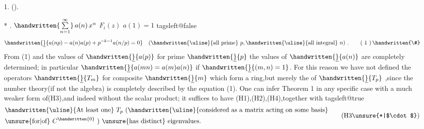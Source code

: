  1. ().

*  .  $\handwritten{\sum\limits_{n=1}^{\infty}}\,a(n)\,x^{n}$  $F_i(z)$  $a(1)=1$ 
\csname tagsleft@false\endcsname
\[
\handwritten{\underline}{a(np)-a(n)a(p)+p^{-k-1}a(n/p)=0}\quad
(\text{\handwritten{\uline}{all prime} }p,\text{\handwritten{\uline}{all integral} }n)\ .
\tag*{( 1 )\,\handwritten{\#}}
\]
From (1) and the values of $\handwritten{\underline}{a(p)}$ for prime $\handwritten{\underline}{p}$ the values of $\handwritten{\underline}{a(n)}$ are completely determined; in particular $\handwritten{\underline}{a(mn)=a(m)a(n)}$ if $\handwritten{\underline}{(m,n)=1}$. For this reason we have not defined the operators $\handwritten{\underline}{T_m}$ for composite $\handwritten{\underline}{m}$ which form a ring,but merely the  of $\handwritten{\underline}{T_p}$ ,since the number theory(if not the algebra) is completely described by the equation (1). One can infer Theorem 1 in any specific case with a much weaker form of(H3),and indeed without the scalar product; it suffices to have (H1),(H2),(H4),together with
\csname tagsleft@true\endcsname
\[
\begin{aligned}
&\text{\handwritten{\uline}{At least one} } T_p\ \text{(\handwritten{\uline}{considered as a matrix acting on some basis}}\\
&\text{\unsure{for|of} } C^{\handwritten{0}}\text{ ) \unsure{has distinct} eigenvalues.}
\end{aligned}
\tag*{(H3\unsure{*|$\cdot$})}
\]
\endgroup


